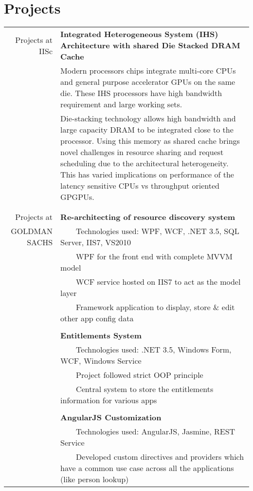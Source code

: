\documentclass[a4paper,10pt]{article} %
\newcommand{\tabitem}{~~\llap{\textbullet}~~}
\begin{document}
\section{Projects}
\begin{tabular}{rp{13cm}}
Projects at IISc& \textbf{Integrated Heterogeneous System (IHS) Architecture with shared Die Stacked DRAM Cache} \\
& \setlength{\leftskip}{0.4cm}
Modern processors chips integrate multi-core CPUs and general purpose accelerator GPUs on the same die. These IHS processors have high bandwidth requirement and large working sets.\\
& \setlength{\leftskip}{0.4cm} 
Die-stacking technology allows high bandwidth and large capacity DRAM to be integrated close to the processor. Using this memory as shared cache brings novel challenges in resource sharing and request scheduling due to the architectural heterogeneity. This has varied implications on performance of the latency sensitive CPUs vs throughput oriented GPGPUs.\\
&\\
&\\
Projects at  &  \textbf{Re-architecting of resource discovery system} \\
GOLDMAN SACHS &  \tabitem Technologies used: WPF, WCF, .NET 3.5, SQL Server, IIS7, VS2010 \\
& \tabitem WPF for the front end with complete MVVM model\\
& \tabitem WCF service hosted on IIS7 to act as the model layer\\
& \tabitem Framework application to display, store \& edit other app config data \\
&\\
& \textbf{Entitlements System}\\
& \tabitem Technologies used: .NET 3.5, Windows Form, WCF, Windows Service\\
& \tabitem Project followed strict OOP principle\\
& \tabitem Central system to store the entitlements information for various apps\\
&\\
& \textbf{AngularJS Customization} \\
& \tabitem Technologies used: AngularJS, Jasmine, REST Service\\
& \tabitem Developed custom directives and providers which have a common use case across all the applications (like person lookup) \\ 

\end{tabular}
\end{document}
